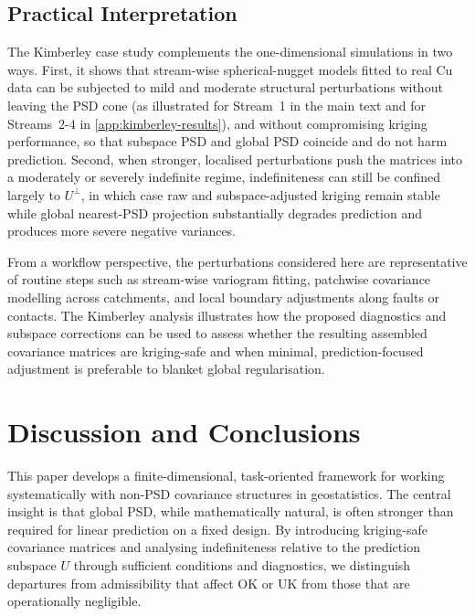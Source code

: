 \documentclass[smallextended]{svjour3}
\newcommand{\1}{\mathbf{1}}
\begin{document}
\subsection{Practical Interpretation}

The Kimberley case study complements the one-dimensional simulations in two ways. First, it shows that stream-wise spherical-nugget models fitted to real Cu data can be subjected to mild and moderate structural perturbations without leaving the PSD cone (as illustrated for Stream~1 in the main text and for Streams~2-4 in \ref{app:kimberley-results}), and without compromising kriging performance, so that subspace PSD and global PSD coincide and do not harm prediction. Second, when stronger, localised perturbations push the matrices into a moderately or severely indefinite regime, indefiniteness can still be confined largely to $U^\perp$, in which case raw and
subspace-adjusted kriging remain stable while global nearest-PSD projection substantially degrades prediction and produces more severe negative variances.

From a workflow perspective, the perturbations considered here are representative of routine steps such as stream-wise variogram fitting, patchwise covariance modelling across catchments, and local boundary adjustments along faults or contacts. The Kimberley analysis illustrates how the proposed diagnostics and subspace corrections can be
used to assess whether the resulting assembled covariance matrices are kriging-safe and when minimal, prediction-focused adjustment is preferable to blanket global regularisation.
	
\section{Discussion and Conclusions}
\label{sec:discussion}

This paper develops a finite-dimensional, task-oriented framework for working systematically with non-PSD covariance structures in geostatistics. The central insight is that global PSD, while mathematically natural, is often stronger than required for linear prediction on a fixed design. By introducing kriging-safe covariance matrices and analysing indefiniteness relative to the prediction subspace $U$ through sufficient conditions and diagnostics, we distinguish departures from admissibility that affect OK or UK from those that are operationally negligible.
\end{document}
